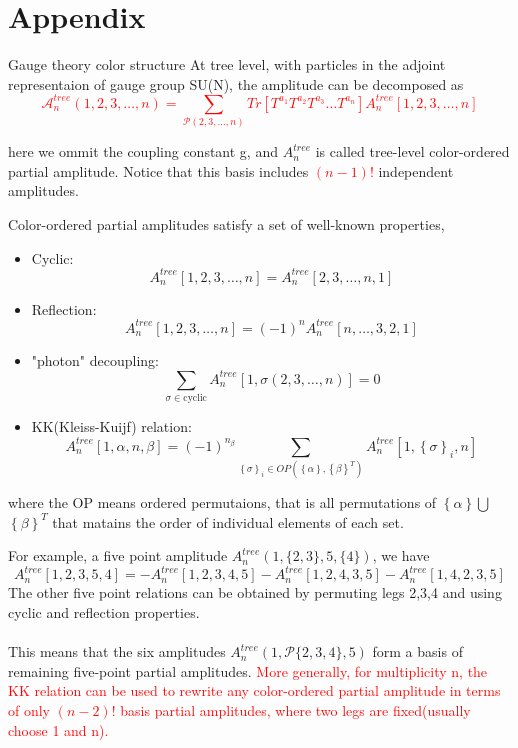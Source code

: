 \documentclass{beamer}
\begin{document}
\section{Appendix}
\appendix
\begin{frame}{Gauge theory color structure}
    At tree level, with particles in the adjoint representaion of gauge group SU(N), the amplitude can be 
decomposed as
\textcolor{red}{\begin{equation*}
    \mathcal{A}_n^{tree}(1,2,3,\dots,n)=\sum _{\mathcal{P}(2,3,\dots,n)}Tr[T^{a_1}T^{a_2}T^{a_3}\dots
    T^{a_n}]A_n^{tree}[1,2,3,\dots,n]
\end{equation*}}

here we ommit the coupling constant g, and $A_n^{tree}$ is called tree-level color-ordered partial amplitude.
Notice that this basis includes \textcolor{red}{$(n-1)!$} independent amplitudes.
\end{frame}
\begin{frame}
    Color-ordered partial amplitudes satisfy a set of well-known properties,
    \begin{itemize}
        \item Cyclic:\quad $$A_n^{tree}[1,2,3,\dots,n]=A_n^{tree}[2,3,\dots,n,1]$$
        \item Reflection: \quad $$A_n^{tree}[1,2,3,\dots,n]=(-1)^nA_n^{tree}[n,\dots,3,2,1]$$
        \item "photon" decoupling: \quad $$\sum_{\sigma\in \text{cyclic}}A_n^{tree}[1,\sigma(2,3,\dots,n)]=0$$
        \item KK(Kleiss-Kuijf) relation:\quad $$A_n^{tree}[1,{\alpha},n,{\beta}]=(-1)^{n_\beta}
        \sum_{\left\{\sigma\right\}_i\in OP(\left\{\alpha\right\},\left\{\beta\right\}^T)}A_n^{tree}[1,\left\{\sigma\right\}_i,n]$$
    \end{itemize}
    where the OP means ordered permutaions, that is all permutations of $\left\{\alpha\right\}$$\bigcup$$\left\{\beta\right\}^T$
    that matains the order of individual elements of each set.
\end{frame}
\begin{frame}
    For example, a five point amplitude $A_n^{tree}(1,\{2,3\},5,\{4\})$, we have
\begin{equation*}
    A_n^{tree}[1,2,3,5,4]=-A_n^{tree}[1,2,3,4,5]-A_n^{tree}[1,2,4,3,5]-A_n^{tree}[1,4,2,3,5]
\end{equation*}
The other five point relations can be obtained by permuting legs 2,3,4 and using cyclic and reflection properties.
\\ \hspace*{\fill}\\
This means that the six amplitudes $A_n^{tree}(1,\mathcal{P}\{2,3,4 \},5 )$ form a basis of remaining five-point partial amplitudes.
\textcolor{red}{More generally, for multiplicity n, the KK relation can be used to rewrite any color-ordered partial amplitude in terms of only $(n-2)!$
basis partial amplitudes, where two legs are fixed(usually choose 1 and n).}
\end{frame}
\end{document}
